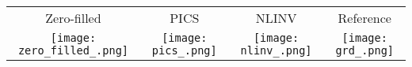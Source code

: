 
\begin{tabular}{c @{\hskip 0pt} c @{\hskip 0pt} c @{\hskip 0pt} c @{\hskip 0pt}}
    Zero-filled& PICS & NLINV & Reference\\
    \texttt{[image: zero\_filled\_.png]}&
    \texttt{[image: pics\_.png]}&
    \texttt{[image: nlinv\_.png]}&
    \texttt{[image: grd\_.png]}
\end{tabular}